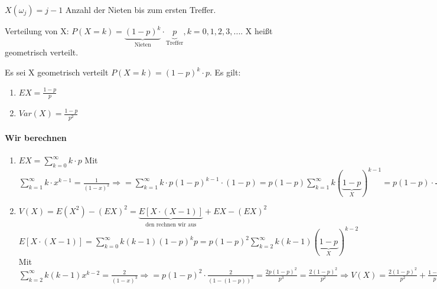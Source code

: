 $ X(\omega_j) = j-1 $ Anzahl der Nieten bis zum ersten Treffer. 

Verteilung von X: 
$
P(X=k) = 
\underbrace{(1-p)^k}_{\textrm{Nieten}} \cdot \underbrace{p}_{\textrm{Treffer}}, k=0,1,2,3,...
$. 
X heißt geometrisch verteilt.

\begin{satz}
Es sei X geometrisch verteilt $P(X=k) = (1-p)^k \cdot p$. Es gilt:

\begin{enumerate}
\item $EX = \frac{1-p}{p}$
\item $Var(X) = \frac{1-p}{p^2}$
\end{enumerate}
\end{satz}

\paragraph{Wir berechnen}
\begin{enumerate}
\item $ EX = \sum_{k=0}^{\infty} k \cdot p$
Mit 
$
\sum_{k=1}^{\infty} k \cdot x^{k-1} = \frac{1}{(1-x)^2} \Rightarrow 
= \sum_{k=1}^{\infty} k\cdot p (1-p)^{k-1} \cdot (1-p)
= p(1-p) \sum_{k=1}^{\infty} k(\underbrace{1-p}_{X})^{k-1}
= p(1-p) \cdot \frac{1}{(1-(1-p))^2}
= \frac{1-p}{p} \checkmark
$
\item $ V(X) = E(X^2) - (EX)^2 
= \underbrace{E[X\cdot (X-1)]}_{\textrm{den rechnen wir aus}} + EX - (EX)^2$\\
$
E[X\cdot (X-1)] 
= \sum_{k=0}^{\infty} k(k-1)(1-p)^k p
= p(1-p)^2 \sum_{k=2}^{\infty} k(k-1)(\underbrace{1-p}_{X})^{k-2}
$
Mit $\sum_{k=2}^{\infty} k(k-1) x^{k-2} = \frac{2}{(1-x)^3} \Rightarrow
= p(1-p)^2 \cdot \frac{2}{(1-(1-p))^3}
= \frac{2p(1-p)^2}{p^3}
= \frac{2(1-p)^2}{p^2}
\Rightarrow V(X) = \frac{2(1-p)^2}{p^2} + \frac{1-p}{p} - \frac{(1-p)^2}{p^2}
= \frac{(1-p)^2}{p^2} + \frac{1-p}{p}
= \frac{(1-p)^2 + (1-p)p}{p^2}
= \frac{(1-p) (1-p + p)}{p^2}
= \frac{1-p}{p^2}
$
\end{enumerate}